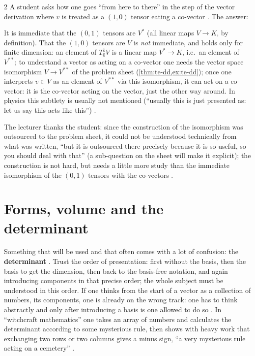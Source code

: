 \begin{paracol}{2}
A student asks how one goes ``from here to there'' in the step of the vector derivation where $v$ is treated as a $(1,0)$ tensor eating a co-vector . The answer:
\begin{intuition}\label{int:te-10}
It is immediate that the $(0,1)$ tensors are $V^*$ (all linear maps $V\to K$, by definition). That the $(1,0)$ tensors are $V$ is \emph{not} immediate, and holds only for finite dimension: an element of $T^1_0V$ is a linear map $V^*\to K$, i.e.\ an element of $V^{**}$; to understand a vector as acting on a co-vector one needs
the vector space isomorphism $V\to V^{**}$ of the problem sheet (\cref{thm:te-dd,ex:te-dd}); once one interprets $v\in V$ as an element of $V^{**}$ via this isomorphism, it can act on a co-vector: it is the co-vector acting on the vector, just the other way around. In physics this subtlety is usually not mentioned (``usually this is just presented as: let us say this acts like this'')
.
\end{intuition}
The lecturer thanks the student: since the construction of the isomorphism was outsourced to the problem sheet, it could not be understood technically from what was written, ``but it is outsourced there precisely because it is so useful, so you should deal with that'' (a sub-question on the sheet will make it explicit); the construction is not hard, but needs a little more study than the
immediate isomorphism of the $(0,1)$ tensors with the co-vectors .

\section{Forms, volume and the determinant}\label{sec:te-det}

Something that will be used and that often comes with a lot of confusion: the \textbf{determinant} . Trust the order of presentation: first without the basis, then the basis to get the dimension, then back to the basis-free notation, and again introducing components in that precise order; the whole subject must be understood in this order. If one thinks from
the start of a vector as a collection of numbers, its components, one is already on the wrong track: one has to think abstractly and only after introducing a basis is one allowed to do so .
In ``witchcraft mathematics'' one takes an array of numbers and calculates the determinant according to some mysterious rule, then shows with heavy work that exchanging two rows or two columns gives a minus sign, ``a very mysterious rule acting on a cemetery'' .


\end{paracol}
